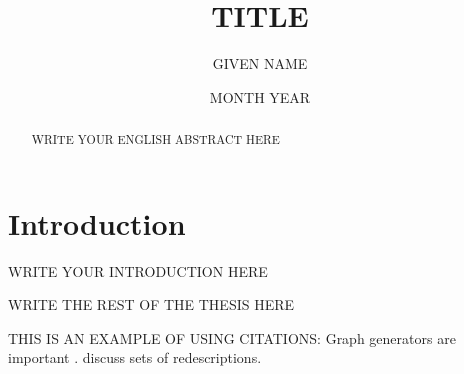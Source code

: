\documentclass[mscthesis,english,oneside]{uefcsthesis}
\title{TITLE} %
\author{GIVEN NAME}{FAMILY NAME} %
\date{MONTH YEAR} %
\begin{document}
\maketitle
\begin{abstract}
  WRITE YOUR ENGLISH ABSTRACT HERE
\end{abstract}

\frontmatter
\tableofcontents
\mainmatter

\chapter{Introduction}
\label{cha:intro}

WRITE YOUR INTRODUCTION HERE

WRITE THE REST OF THE THESIS HERE

THIS IS AN EXAMPLE OF USING CITATIONS:
Graph generators are important \citep{metzler18random}.
\citet{kalofolias18from} discuss sets of redescriptions.



\backmatter %
\end{document}
